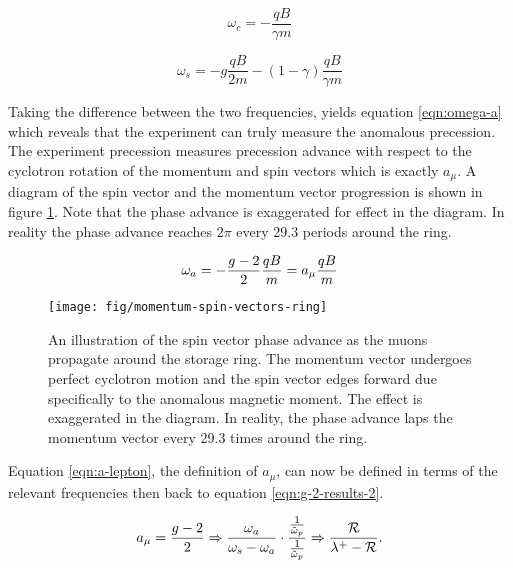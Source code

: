 \begin{equation}
\label{eqn:omega-cyclotron}
\omega_c = -\frac{q B}{\gamma m}
\end{equation}

\begin{equation}
\label{eqn:omega-spin}
\omega_s = -g\frac{q B}{2 m} - (1 - \gamma) \frac{q B}{\gamma m}
\end{equation}

Taking the difference between the two frequencies, yields equation \ref{eqn:omega-a} which reveals that the experiment can truly measure the anomalous precession.  The experiment precession measures precession advance with respect to the cyclotron rotation of the momentum and spin vectors which is exactly $a_\mu$.  A diagram of the spin vector and the momentum vector progression is shown in figure \ref{fig:momentum-spin-vectors-ring}.  Note that the phase advance is exaggerated for effect in the diagram.  In reality the phase advance reaches $2\pi$ every 29.3 periods around the ring.

\begin{equation}
\label{eqn:omega-a}
\omega_a = -\frac{g - 2}{2} \frac{q B}{m} \\
= a_\mu \frac{q B}{m}
\end{equation}

\begin{figure}
\label{fig:momentum-spin-vectors-ring}
\centering
\texttt{[image: fig/momentum-spin-vectors-ring]}
\caption{An illustration of the spin vector phase advance as the muons propagate around the storage ring.  The momentum vector undergoes perfect cyclotron motion and the spin vector edges forward due specifically to the anomalous magnetic moment.  The effect is exaggerated in the diagram.  In reality, the phase advance laps the momentum vector every 29.3 times around the ring.}
\end{figure}

Equation \ref{eqn:a-lepton}, the definition of $a_\mu$, can now be defined in terms of the relevant frequencies then back to equation \ref{eqn:g-2-results-2}.

\begin{equation}
\label{eqn:a-mu-precession-1}
a_\mu = \frac{g - 2}{2} \\
\Rightarrow \frac{\omega_a}{\omega_s - \omega_a} \cdot \\
\frac{\frac{1}{\tilde{\omega}_p}}{\frac{1}{\tilde{\omega}_p}} \\
\Rightarrow \frac{\mathcal{R}}{\lambda^+ - \mathcal{R}}.
\end{equation}

